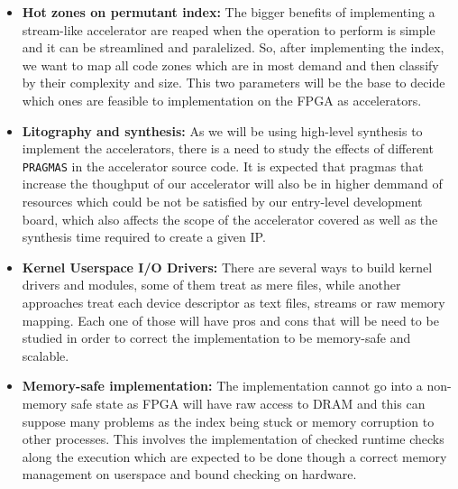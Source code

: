 \begin{itemize}
    \item {\textbf{Hot zones on permutant index:} The bigger benefits of implementing a stream-like accelerator are reaped when the operation
    to perform is simple and it can be streamlined and paralelized. So, after implementing the index, we want to map all code zones which are in most 
    demand and then classify by their complexity and size. This two parameters will be the base to decide which ones are feasible to implementation
    on the FPGA as accelerators.}
    \item {\textbf{Litography and synthesis:} As we will be using high-level synthesis to implement the accelerators, there is a need to study the 
    effects of different \texttt{PRAGMAS} in the accelerator source code. It is expected that pragmas that increase the thoughput of our 
    accelerator will also be in higher demmand of resources which could be not be satisfied by our entry-level development board, which also affects
    the scope of the accelerator covered as well as the synthesis time required to create a given IP.}
    \item {\textbf{Kernel Userspace I/O Drivers:} There are several ways to build kernel drivers and modules, some of them treat as mere files, while
    another approaches treat each device descriptor as text files, streams or raw memory mapping. Each one of those will have pros and cons that
    will be need to be studied in order to correct the implementation to be memory-safe and scalable.}
    \item {\textbf{Memory-safe implementation:} The implementation cannot go into a non-memory safe state as FPGA will have raw access to DRAM and this 
    can suppose many problems as the index being stuck or memory corruption to other processes. This involves the implementation of checked runtime checks
    along the execution which are expected to be done though a correct memory management on userspace and bound checking on hardware.}
\end{itemize}
